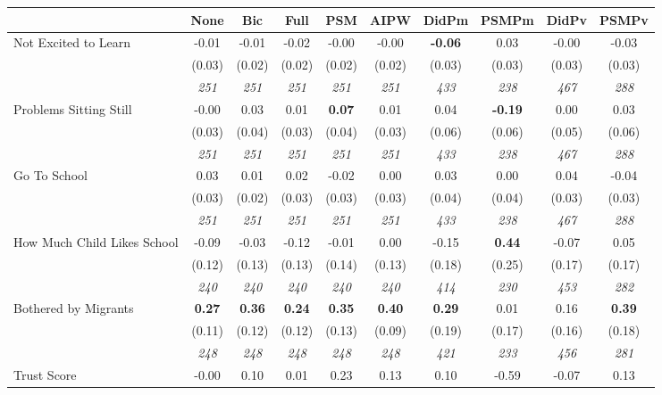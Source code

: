 \begin{tabular}{l c c c c c c c c c}
\toprule
 & None & Bic & Full & PSM & AIPW & DidPm & PSMPm & DidPv & PSMPv \\
\midrule
Not Excited to Learn & -0.01 & -0.01 & -0.02 & -0.00 & -0.00 & \textbf{ -0.06 } & 0.03 & -0.00 & -0.03 \\
& (0.03) & (0.02) & (0.02) & (0.02) & (0.02) & (0.03) & (0.03) & (0.03) & (0.03) \\
& \textit{ 251 } & \textit{ 251 } & \textit{ 251 } & \textit{ 251 } & \textit{ 251 } & \textit{ 433 } & \textit{ 238 } & \textit{ 467 } & \textit{ 288 } \\
Problems Sitting Still & -0.00 & 0.03 & 0.01 & \textbf{0.07} & 0.01 & 0.04 & \textbf{-0.19} & 0.00 & 0.03 \\
& (0.03) & (0.04) & (0.03) & (0.04) & (0.03) & (0.06) & (0.06) & (0.05) & (0.06) \\
& \textit{ 251 } & \textit{ 251 } & \textit{ 251 } & \textit{ 251 } & \textit{ 251 } & \textit{ 433 } & \textit{ 238 } & \textit{ 467 } & \textit{ 288 } \\
Go To School & 0.03 & 0.01 & 0.02 & -0.02 & 0.00 & 0.03 & 0.00 & 0.04 & -0.04 \\
& (0.03) & (0.02) & (0.03) & (0.03) & (0.03) & (0.04) & (0.04) & (0.03) & (0.03) \\
& \textit{ 251 } & \textit{ 251 } & \textit{ 251 } & \textit{ 251 } & \textit{ 251 } & \textit{ 433 } & \textit{ 238 } & \textit{ 467 } & \textit{ 288 } \\
How Much Child Likes School & -0.09 & -0.03 & -0.12 & -0.01 & 0.00 & -0.15 & \textbf{0.44} & -0.07 & 0.05 \\
& (0.12) & (0.13) & (0.13) & (0.14) & (0.13) & (0.18) & (0.25) & (0.17) & (0.17) \\
& \textit{ 240 } & \textit{ 240 } & \textit{ 240 } & \textit{ 240 } & \textit{ 240 } & \textit{ 414 } & \textit{ 230 } & \textit{ 453 } & \textit{ 282 } \\
Bothered by Migrants & \textbf{ 0.27 } & \textbf{ 0.36 } & \textbf{ 0.24 } & \textbf{0.35} & \textbf{0.40} & \textbf{ 0.29 } & 0.01 & 0.16 & \textbf{0.39} \\
& (0.11) & (0.12) & (0.12) & (0.13) & (0.09) & (0.19) & (0.17) & (0.16) & (0.18) \\
& \textit{ 248 } & \textit{ 248 } & \textit{ 248 } & \textit{ 248 } & \textit{ 248 } & \textit{ 421 } & \textit{ 233 } & \textit{ 456 } & \textit{ 281 } \\
Trust Score & -0.00 & 0.10 & 0.01 & 0.23 & 0.13 & 0.10 & -0.59 & -0.07 & 0.13 \\

\end{tabular}
